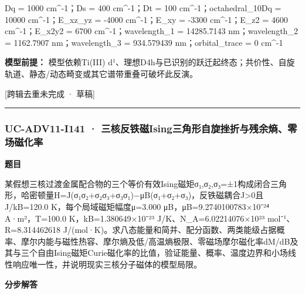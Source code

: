 \documentclass[UTF8,11pt,a4paper]{ctexart}
\begin{document}
Dq = 1000 cm\textasciicircum{}-1；Ds = 400 cm\textasciicircum{}-1；Dt = 100 cm\textasciicircum{}-1；octahedral\_10Dq = 10000 cm\textasciicircum{}-1；E\_xz\_yz = -4000 cm\textasciicircum{}-1；E\_xy = -3300 cm\textasciicircum{}-1；E\_z2 = 4600 cm\textasciicircum{}-1；E\_x2y2 = 6700 cm\textasciicircum{}-1；wavelength\_1 = 14285.7143 nm；wavelength\_2 = 1162.7907 nm；wavelength\_3 = 934.579439 nm；orbital\_trace = 0 cm\textasciicircum{}-1\par
\noindent\textbf{模型前提：}
模型依赖Ti(III) d¹、理想D4h与已识别的跃迁起终态；共价性、自旋轨道、静态/动态畸变或其它谱带重叠可破坏此反演。\par
\noindent\textcolor{red!65!black}{[跨辑去重未完成 · 草稿]} \par
\medskip\hrule\medskip
{}
\subsubsection*{UC-ADV11-I141 · 三核反铁磁Ising三角形自旋挫折与残余熵、零场磁化率}
\noindent\textbf{题目}\par
某假想三核过渡金属配合物的三个等价有效Ising磁矩σ₁,σ₂,σ₃=±1构成闭合三角形，哈密顿量H=J(σ₁σ₂+σ₂σ₃+σ₃σ₁)−μB(σ₁+σ₂+σ₃)，反铁磁耦合J>0且J/kB=120.0 K，每个局域磁矩幅度μ=3.000 μB，μB=9.2740100783×10⁻²⁴ A·m²，T=100.0 K，kB=1.380649×10⁻²³ J/K、N\_A=6.02214076×10²³ mol⁻¹、R=8.314462618 J/(mol·K)。求八态能量和简并、配分函数、两类能级占据概率、摩尔内能与磁性热容、摩尔熵及低/高温熵极限、零磁场摩尔磁化率dM/dB及其与三个自由Ising磁矩Curie磁化率的比值，验证能量、概率、温度边界和小场线性响应唯一性，并说明现实三核分子磁体的模型局限。\par
\medskip\noindent\textbf{分步解答}
\end{document}
